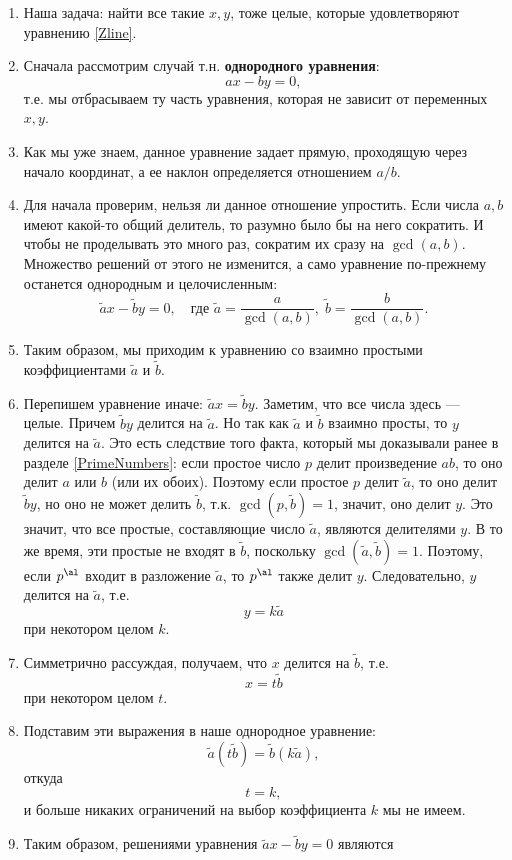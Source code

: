 \begin{enumerate}
\item Наша задача: найти все такие $x,y$, тоже целые, которые удовлетворяют уравнению \eqref{Zline}.
\item Сначала рассмотрим случай т.н. \textbf{однородного уравнения}:
$$
ax-by=0,
$$
т.е. мы отбрасываем ту часть уравнения, которая не зависит от переменных $x,y$.
\item Как мы уже знаем, данное уравнение задает прямую, проходящую через начало координат, а ее наклон определяется отношением $a/b$.
\item Для начала проверим, нельзя ли данное отношение упростить. Если числа $a,b$ имеют какой-то общий делитель, то разумно было бы на него сократить. И чтобы не проделывать это много раз, сократим их сразу на $\gcd(a,b)$. Множество решений от этого не изменится, а само уравнение по-прежнему останется однородным и целочисленным:
$$
\tilde ax-\tilde by=0,\quad\mbox{где } \tilde a=\frac{a}{\gcd(a,b)},\;\tilde b=\frac{b}{\gcd(a,b)}.
$$
\item Таким образом, мы приходим к уравнению со взаимно простыми коэффициентами $\tilde a$ и $\tilde b$.
\item Перепишем уравнение иначе: $\tilde ax=\tilde by$. Заметим, что все числа здесь --- целые. Причем $\tilde by$ делится на $\tilde a$. Но так как $\tilde a$ и $\tilde b$ взаимно просты, то $y$ делится на $\tilde a$. Это есть следствие того факта, который мы доказывали ранее в разделе \ref{PrimeNumbers}: если простое число $p$ делит произведение $ab$, то оно делит $a$ или $b$ (или их обоих). Поэтому если простое $p$ делит $\tilde a$, то оно делит $\tilde by$, но оно не может делить $\tilde b$, т.к. $\gcd(p,\tilde b)=1$, значит, оно делит $y$. Это значит, что все простые, составляющие число $\tilde a$, являются делителями $y$. В то же время, эти простые не входят в $\tilde b$, поскольку $\gcd(\tilde a,\tilde b)=1$. Поэтому, если $p^\al$ входит в разложение $\tilde a$, то $p^\al$ также делит $y$. Следовательно, $y$ делится на $\tilde a$, т.е. 
$$
y=k\tilde a
$$
при некотором целом $k$.
\item Симметрично рассуждая, получаем, что $x$ делится на $\tilde b$, т.е.
$$
x=t\tilde b
$$
при некотором целом $t$.
\item Подставим эти выражения в наше однородное уравнение:
$$
\tilde a(t\tilde b)=\tilde b(k\tilde a),
$$
откуда
$$
t=k,
$$
и больше никаких ограничений на выбор коэффициента $k$ мы не имеем.
\item Таким образом, решениями уравнения $\tilde ax-\tilde by=0$ являются

\end{enumerate}
